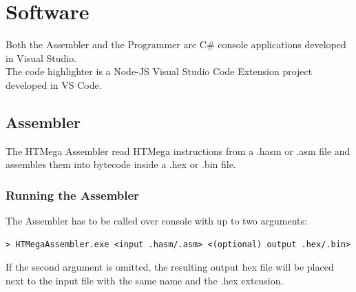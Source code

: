 \section{Software}
Both the Assembler and the Programmer are C\# console applications developed in Visual Studio.\\ 
The code highlighter is a Node-JS Visual Studio Code Extension project developed in VS Code. 

\subsection{Assembler}
The HTMega Assembler read HTMega instructions from a .hasm or .asm file and assembles them into bytecode inside a .hex or .bin file.

\subsubsection{Running the Assembler}
The Assembler has to be called over console with up to two arguments:
\begin{mdframed}[backgroundcolor=light-gray, roundcorner=10pt,leftmargin=1, rightmargin=1, innerleftmargin=15, innertopmargin=6,innerbottommargin=6, outerlinewidth=1, linecolor=light-gray]
    \begin{lstlisting}[style=hasm]
    > HTMegaAssembler.exe <input .hasm/.asm> <(optional) output .hex/.bin>
    \end{lstlisting}
\end{mdframed}
If the second argument is omitted, the resulting output hex file will be placed next to the input file with the same name and the .hex extension.

